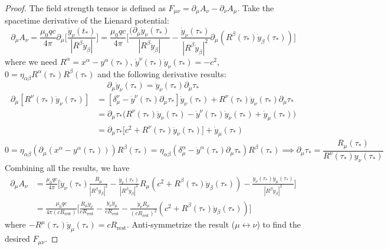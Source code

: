 \documentclass[a4paper]{article}
\theoremstyle{new}
\begin{document}
\begin{proof}
The field strength tensor is defined as $F_{\mu\nu}=\partial_\mu A_\nu-\partial_\nu A_\mu$. Take the spacetime derivative of the Lienard potential:
$$\partial_\mu A_\nu=\frac{\mu_0qc}{4\pi}\partial_\mu\bigg[\frac{\dot{y}_\nu(t_*)}{|R^\beta\dot{y}_\beta|}\bigg]=\frac{\mu_0qc}{4\pi}\bigg[\frac{(\partial_\mu\dot{y}_\nu(\tau_*)}{|R^\beta\dot{y}_\beta|}-\frac{\dot{y}_\nu(\tau_*)}{|R^\beta\dot{y}_\beta|^2}\partial_\mu(R^\beta(\tau_*)\dot{y}_\beta(\tau_*))\bigg]$$
where we need $R^\alpha=x^\alpha-y^\alpha(\tau_*)$, $\dot{y}^\nu(\tau_*)\dot{y}_\nu(\tau_*)=-c^2$, $0=\eta_{\alpha\beta}R^\alpha(\tau_*)R^\beta(\tau_*)$ and the following derivative results:
$$\partial_\mu\dot{y}_\nu(\tau_*)=\ddot{y}_\nu(\tau_*)\partial_\mu\tau_*$$
\begin{align}
    \partial_\mu[R^\nu(\tau_*)\dot{y}_\nu(\tau_*)]&=[\delta^\nu_\mu-\dot{y}^\nu(\tau_*)\partial_\mu\tau_*]\dot{y}_\nu(\tau_*)+R^\nu(\tau_*)\ddot{y}_\nu(\tau_*)\partial_\mu\tau_*\nonumber\\&=\partial_\mu\tau_*\bigg(R^\nu(\tau_*)\ddot{y}_\nu(\tau_*)-\dot{y}^\nu(\tau_*)\dot{y}_\nu(\tau_*)+\dot{y}_\mu(\tau_*)\bigg)\nonumber\\&=\partial_\mu\tau_*\bigg[c^2+R^\nu(\tau_*)\ddot{y}_\nu(\tau_*)\bigg]+\dot{y}_\mu(\tau_*)\nonumber
\end{align}
$$0=\eta_{\alpha\beta}(\partial_\mu(x^\alpha-y^\alpha(\tau_*)))R^\beta(\tau_*)=\eta_{\alpha\beta}(\delta^\alpha_\mu-\dot{y}^\alpha(\tau_*)\partial_\mu\tau_*)R^\beta(\tau_*)\implies\partial_\mu\tau_*=\frac{R_\mu(\tau_*)}{R^\nu(\tau_*)y_\nu(\tau_*)}$$
Combining all the results, we have
\begin{align}
    \partial_\mu A_\nu&=\frac{\mu_0qc}{4\pi}\bigg[\ddot{y}_\nu(\tau_*)\frac{R_\mu}{|R^\beta y_\beta|^2}-\frac{\dot{y}_\nu(\tau_*)}{|R^\beta\dot{y}_\beta|^3}R_\mu(c^2+R^\beta(\tau_*)\ddot{y}_\beta(\tau_*))-\frac{\dot{y}_\nu(\tau_*)\dot{y}_\mu(\tau_*)}{|R^\beta\dot{y}_\beta|^2}\bigg]\nonumber\\&=\frac{\mu_0qc}{4\pi(cR_{\text{rest}})}\bigg[\frac{R_\mu\ddot{y}_\nu}{cR_{\text{rest}}}-\frac{\dot{y}_\nu\dot{y}_\mu}{cR_{\text{rest}}}-\frac{\dot{y}_\nu R_\mu}{(cR_{\text{rest}})^2}(c^2+R^\beta(\tau_*)\ddot{y}_\beta(\tau_*))\bigg]\nonumber
\end{align}
where $-R^\mu(\tau_*)\dot{y}_\mu(\tau_*)=cR_{\text{rest}}$. Anti-symmetrize the result ($\mu\leftrightarrow\nu$) to find the desired $F_{\mu\nu}$.
\end{proof}
\newpage
\end{document}
